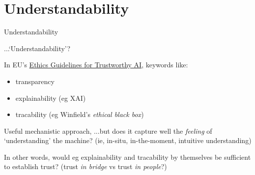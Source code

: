 \documentclass[xcolor=table,aspectratio=169]{beamer}
\begin{document}
\section*{Understandability}

\begin{frame}{Understandability}

    ...`Understandability'?

    \pause

    In EU's \href{https://digital-strategy.ec.europa.eu/en/library/ethics-guidelines-trustworthy-ai}{Ethics Guidelines
    for Trustworthy AI}, keywords like:

    \begin{itemize}
        \item transparency
        \item explainability (eg XAI)
        \item tracability (eg Winfield's \emph{ethical black box})
    \end{itemize}

    \pause

    Useful mechanistic approach, ...but does it capture well the \emph{feeling}
    of `understanding' the machine? (ie, in-situ, in-the-moment, intuitive
    understanding)

    \pause

    In other words, would eg explainability and tracability by themselves be
    sufficient to establish trust? {\footnotesize (trust \emph{in bridge} vs trust \emph{in
    people}?)}

\end{frame}
%
%
%
%
%
%
\end{document}
